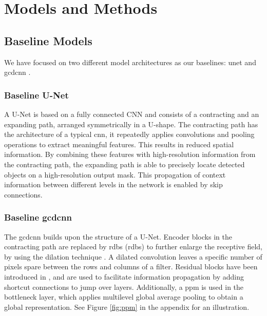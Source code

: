 \section{Models and Methods} \label{section:models}

\subsection{Baseline Models}

We have focused on two different model architectures as our baselines: \acrshort{unet} \cite{unet} and \acrshort{gcdcnn} \cite{gcdcnn}.

\subsubsection{Baseline U-Net}
A U-Net is based on a fully connected CNN and consists of a contracting and an expanding path, arranged symmetrically in a U-shape. The contracting path has the architecture of a typical \acrshort{cnn}, it repeatedly applies convolutions and pooling operations to extract meaningful features. This results in reduced spatial information. By combining these features with high-resolution information from the contracting path, the expanding path is able to precisely locate detected objects on a high-resolution output mask. This propagation of context information between different levels in the network is enabled by skip connections.
\subsubsection{Baseline \acrshort{gcdcnn}}

The \acrfull{gcdcnn} builds upon the structure of a U-Net. Encoder blocks in the contracting path are replaced by \acrlong{rdb}s (\acrshort{rdb}s) to further enlarge the receptive field, by using the dilation technique \cite{dumoulin2016guide}. A dilated convolution leaves a specific number of pixels spare between the rows and columns of a filter. Residual blocks have been introduced in \cite{residual}, and are used to facilitate information propagation by adding shortcut connections to jump over layers. Additionally, a \acrfull{ppm} is used in the bottleneck layer, which applies multilevel global average pooling to obtain a global representation. See Figure \ref{fig:ppm} in the appendix for an illustration.



